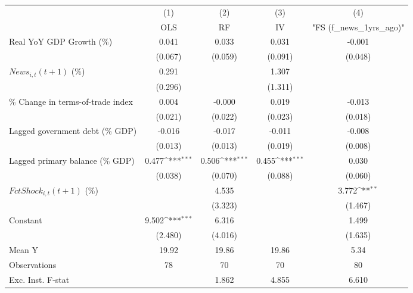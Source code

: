 {
\def\sym#1{\ifmmode^{#1}\else\(^{#1}\)\fi}
\begin{tabular}{l*{4}{c}}
\toprule
                    &\multicolumn{1}{c}{(1)}&\multicolumn{1}{c}{(2)}&\multicolumn{1}{c}{(3)}&\multicolumn{1}{c}{(4)}\\
                    &\multicolumn{1}{c}{OLS}&\multicolumn{1}{c}{RF}&\multicolumn{1}{c}{IV}&\multicolumn{1}{c}{ "FS (f_news_1yrs_ago)" }\\
\midrule
Real YoY GDP Growth (\%)&       0.041         &       0.033         &       0.031         &      -0.001         \\
                    &     (0.067)         &     (0.059)         &     (0.091)         &     (0.048)         \\
\addlinespace
$ News_{i,t}(t+1)$ (\%)&       0.291         &                     &       1.307         &                     \\
                    &     (0.296)         &                     &     (1.311)         &                     \\
\addlinespace
\% Change in terms-of-trade index&       0.004         &      -0.000         &       0.019         &      -0.013         \\
                    &     (0.021)         &     (0.022)         &     (0.023)         &     (0.018)         \\
\addlinespace
Lagged government debt (\% GDP)&      -0.016         &      -0.017         &      -0.011         &      -0.008         \\
                    &     (0.013)         &     (0.013)         &     (0.019)         &     (0.008)         \\
\addlinespace
Lagged primary balance (\% GDP)&       0.477\sym{***}&       0.506\sym{***}&       0.455\sym{***}&       0.030         \\
                    &     (0.038)         &     (0.070)         &     (0.088)         &     (0.060)         \\
\addlinespace
$ FctShock_{i,t}(t+1)$ (\%)&                     &       4.535         &                     &       3.772\sym{**} \\
                    &                     &     (3.323)         &                     &     (1.467)         \\
\addlinespace
Constant            &       9.502\sym{***}&       6.316         &                     &       1.499         \\
                    &     (2.480)         &     (4.016)         &                     &     (1.635)         \\
\midrule
Mean Y              &       19.92         &       19.86         &       19.86         &        5.34         \\
Observations        &          78         &          70         &          70         &          80         \\
Exc. Inst. F-stat   &                     &       1.862         &       4.855         &       6.610         \\
\bottomrule
\end{tabular}
}

